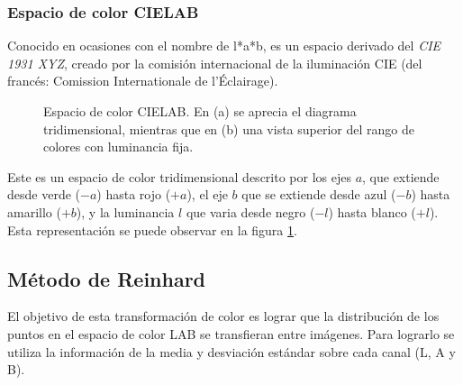 \subsubsection*{Espacio de color CIELAB}

Conocido en ocasiones con el nombre de l*a*b, es un espacio derivado del \textit{CIE 1931 XYZ}, creado por la comisión internacional de la iluminación CIE (del francés: Comission Internationale de l'Éclairage).

\begin{figure}[h]
	\centering     %
	
	\caption[Espacio de color CIELAB]{Espacio de color CIELAB. En (a) se aprecia el diagrama tridimensional, mientras que en (b) una vista superior del rango de colores con luminancia fija.}
	\label{imagen:lab-color}
\end{figure}

Este es un espacio de color tridimensional descrito por los ejes $a$, que extiende desde verde ($-a$) hasta rojo ($+a$), el eje $b$ que se extiende desde azul ($-b$) hasta amarillo ($+b$), y la luminancia $l$ que varia desde negro ($-l$) hasta blanco ($+l$). Esta representación se puede observar en la figura \ref{imagen:lab-color}.

\subsection{Método de Reinhard}
El objetivo de esta transformación de color es lograr que la distribución de los puntos en el espacio de color LAB se transfieran entre imágenes. Para lograrlo se utiliza la información de la media y desviación estándar sobre cada canal (L, A y B).

